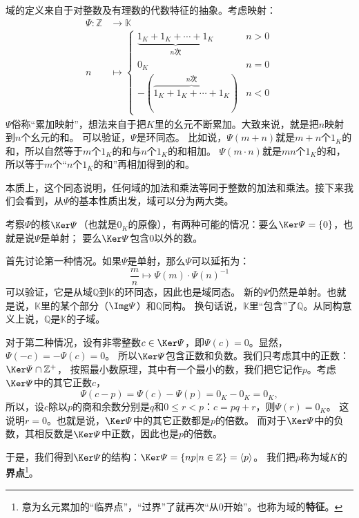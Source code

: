 \documentclass[12pt,UTF8,fontset=none]{ctexbook}
\begin{document}
\begin{appendix}
域的定义来自于对整数及有理数的代数特征的抽象。考虑映射：
\begin{align*}
    \varPsi : \mathbb{Z} &\rightarrow \mathbb{K}   \\
    n &\mapsto \left\{\begin{array}{rr}\underbrace{1_{K} + 1_{K} + \cdots + 1_{K}}_{n\mbox{次}} & n > 0 \\ 0_{K} & n = 0\\ -(\overbrace{1_{K} + 1_{K} + \cdots + 1_{K}}^{n\mbox{次}}) & n < 0  \end{array} \right.
\end{align*}
$\varPsi$俗称“累加映射”，想法来自于把$K$里的幺元不断累加。大致来说，就是把$n$映射到$n$个幺元的和。
可以验证，$\varPsi$是环同态。
比如说，$\varPsi(m+n)$就是$m+n$个$1_{K}$的和，所以自然等于$m$个$1_{K}$的和与$n$个$1_{K}$的和相加。
$\varPsi(m\cdot n)$就是$mn$个$1_{K}$的和，所以等于$m$个“$n$个$1_{K}$的和”再相加得到的和。

本质上，这个同态说明，任何域的加法和乘法等同于整数的加法和乘法。接下来我们会看到，从$\varPsi$的基本性质出发，域可以分为两大类。

考察$\varPsi$的核$\Ker \varPsi$（也就是$0_K$的原像），有两种可能的情况：要么$\Ker \varPsi = \{0\}$，也就是说$\varPsi$是单射；
要么$\Ker \varPsi$包含$0$以外的数。

首先讨论第一种情况。如果$\varPsi$是单射，那么$\varPsi$可以延拓为：
$$ \frac{m}{n} \mapsto \varPsi(m) \cdot \varPsi(n)^{-1} $$
可以验证，它是从域$\mathbb{Q}$到$\mathbb{K}$的环同态，因此也是域同态。
新的$\varPsi$仍然是单射。也就是说，$\mathbb{K}$里的某个部分（$\Img \varPsi$）和$\mathbb{Q}$同构。
换句话说，$\mathbb{K}$里“包含”了$\mathbb{Q}$。从同构意义上说，$\mathbb{Q}$是$\mathbb{K}$的子域。

对于第二种情况，设有非零整数$c \in \Ker \varPsi$，即$\varPsi(c) = 0$。显然，$\varPsi(-c) = -\varPsi(c) = 0$。
所以$\Ker \varPsi$包含正数和负数。我们只考虑其中的正数：$\Ker \varPsi \cap \mathbb{Z}^+$，
按照最小数原理，其中有一个最小的数，我们把它记作$p$。考虑$\Ker \varPsi$中的其它正数$c$，
$$\varPsi(c - p) = \varPsi(c) - \varPsi(p) = 0_{K} - 0_{K} = 0_{K},$$
所以，设$c$除以$p$的商和余数分别是$q$和$0\leqslant r<p$：$c = pq + r$，则$\varPsi(r) = 0_{K}$。
这说明$r = 0$。也就是说，$\Ker \varPsi$中的其它正数都是$p$的倍数。
而对于$\Ker \varPsi$中的负数，其相反数是$\Ker \varPsi$中正数，因此也是$p$的倍数。

于是，我们得到$\Ker \varPsi$的结构：$\Ker \varPsi = \{np | n\in \mathbb{Z}\} = \langle p \rangle$。
我们把$p$称为域$K$的\textbf{界点}\footnote{意为幺元累加的“临界点”，“过界”了就再次“从$0$开始”。也称为域的\textbf{特征}。}。


\end{appendix}
\end{document}
